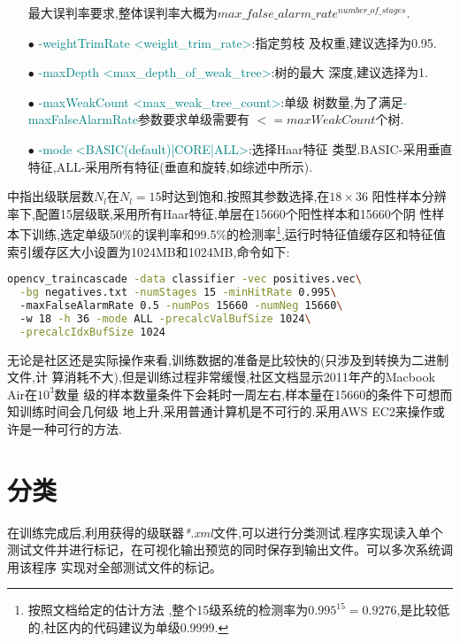 \documentclass[10pt,technote]{IEEEtran}
\begin{document}
\begin{enumerate}
最大误判率要求,整体误判率大概为$max\_false\_alarm\_rate^{number\_of\_stages}$.
\item[$\bullet$]\textcolor{teal}{-weightTrimRate <weight\_trim\_rate>}:指定剪枝
及权重,建议选择为0.95.
\item[$\bullet$]\textcolor{teal}{-maxDepth <max\_depth\_of\_weak\_tree>}:树的最大
深度,建议选择为1.
\item[$\bullet$]\textcolor{teal}{-maxWeakCount <max\_weak\_tree\_count>}:单级
树数量,为了满足\textcolor{teal}{-maxFalseAlarmRate}参数要求单级需要有
$<=maxWeakCount$个树.
\item[$\bullet$]\textcolor{teal}{-mode <BASIC(default)|CORE|ALL>}:选择Haar特征
类型.BASIC-采用垂直特征,ALL-采用所有特征(垂直和旋转,如综述\cite{bib1}中所示).
\end{enumerate}
\cite{bib1}中指出级联层数$N_l$在$N_l=15$时达到饱和,按照其参数选择,在$18\times36$
阳性样本分辨率下,配置15层级联,采用所有Haar特征,单层在15660个阳性样本和15660个阴
性样本下训练,选定单级50\%的误判率和99.5\%的检测率\footnote{按照文档给定的估计方法
,整个15级系统的检测率为$0.995^{15}=0.9276$,是比较低的,社区内的代码建议为单级0.9999.
},运行时特征值缓存区和特征值索引缓存区大小设置为1024MB和1024MB,命令如下:
\begin{lstlisting}[language=bash]
opencv_traincascade -data classifier -vec positives.vec\
  -bg negatives.txt -numStages 15 -minHitRate 0.995\ 
  -maxFalseAlarmRate 0.5 -numPos 15660 -numNeg 15660\ 
  -w 18 -h 36 -mode ALL -precalcValBufSize 1024\
  -precalcIdxBufSize 1024
\end{lstlisting}
无论是社区还是实际操作来看,训练数据的准备是比较快的(只涉及到转换为二进制文件,计
算消耗不大),但是训练过程非常缓慢,社区文档显示2011年产的Macbook Air在$10^3$数量
级的样本数量条件下会耗时一周左右,样本量在15660的条件下可想而知训练时间会几何级
地上升,采用普通计算机是不可行的.采用AWS EC2来操作或许是一种可行的方法.
\section{分类}
在训练完成后,利用获得的级联器\textit{*.xml}文件,可以进行分类测试.程序实现读入单个
测试文件并进行标记，在可视化输出预览的同时保存到输出文件。可以多次系统调用该程序
实现对全部测试文件的标记。
\end{document}
